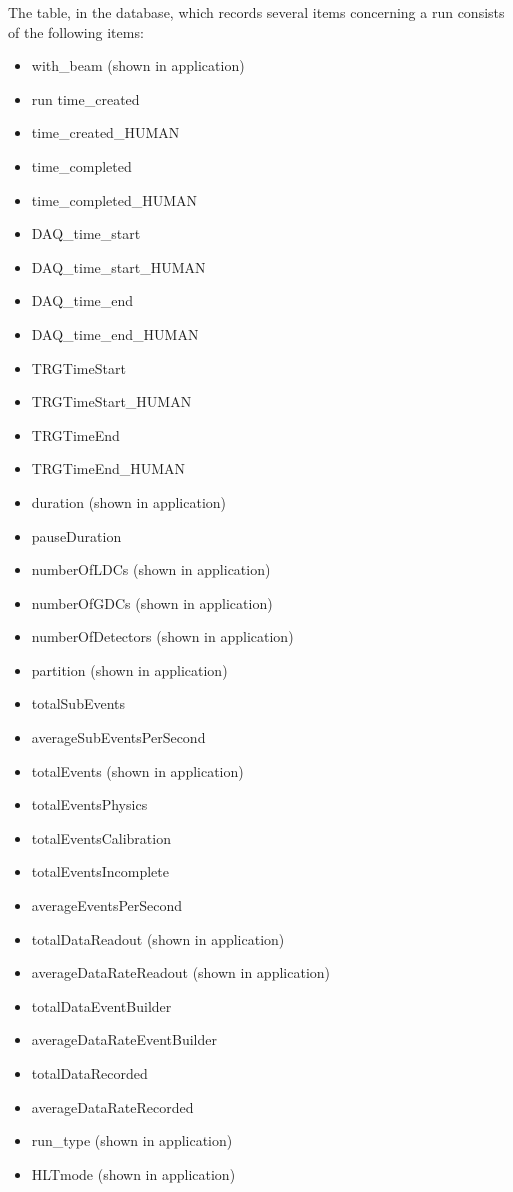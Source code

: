 \documentclass[a4paper,11pt]{book}
\begin{document}
The table, in the database, which records several items concerning a run consists of the following items:
\begin{itemize}
  \item with\_beam	(shown in application)
  \item run	time\_created	
  \item time\_created\_HUMAN	
  \item time\_completed	
  \item time\_completed\_HUMAN	
  \item DAQ\_time\_start	
  \item DAQ\_time\_start\_HUMAN	
  \item DAQ\_time\_end	
  \item DAQ\_time\_end\_HUMAN	
  \item TRGTimeStart	
  \item TRGTimeStart\_HUMAN	
  \item TRGTimeEnd	
  \item TRGTimeEnd\_HUMAN	
  \item duration (shown in application)
  \item pauseDuration	
  \item numberOfLDCs (shown in application)
  \item numberOfGDCs (shown in application)
  \item numberOfDetectors (shown in application)
  \item partition (shown in application)
  \item totalSubEvents	
  \item averageSubEventsPerSecond	
  \item totalEvents (shown in application)
  \item totalEventsPhysics	
  \item totalEventsCalibration	
  \item totalEventsIncomplete	
  \item averageEventsPerSecond	
  \item totalDataReadout (shown in application)
  \item averageDataRateReadout (shown in application)
  \item totalDataEventBuilder	
  \item averageDataRateEventBuilder	
  \item totalDataRecorded	
  \item averageDataRateRecorded	
  \item run\_type (shown in application)
  \item HLTmode (shown in application)

\end{itemize}
\end{document}
